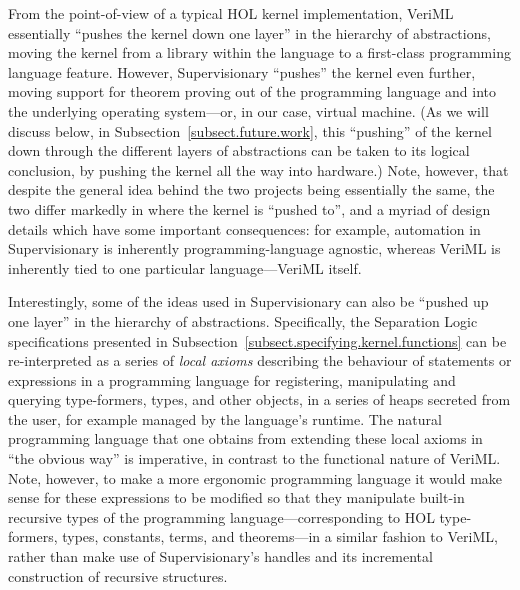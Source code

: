\documentclass[a4paper, UKenglish, cleveref, autoref, thm-restate, colorlinks]{lipics-v2021}
\begin{document}
From the point-of-view of a typical HOL kernel implementation, VeriML essentially ``pushes the kernel down one layer'' in the hierarchy of abstractions, moving the kernel from a library within the language to a first-class programming language feature.
However, Supervisionary ``pushes'' the kernel even further, moving support for theorem proving out of the programming language and into the underlying operating system---or, in our case, virtual machine.
(As we will discuss below, in Subsection~\ref{subsect.future.work}, this ``pushing'' of the kernel down through the different layers of abstractions can be taken to its logical conclusion, by pushing the kernel all the way into hardware.)
Note, however, that despite the general idea behind the two projects being essentially the same, the two differ markedly in where the kernel is ``pushed to'', and a myriad of design details which have some important consequences: for example, automation in Supervisionary is inherently programming-language agnostic, whereas VeriML is inherently tied to one particular language---VeriML itself.

Interestingly, some of the ideas used in Supervisionary can also be ``pushed up one layer'' in the hierarchy of abstractions.
Specifically, the Separation Logic specifications presented in Subsection~\ref{subsect.specifying.kernel.functions} can be re-interpreted as a series of \emph{local axioms} describing the behaviour of statements or expressions in a programming language for registering, manipulating and querying type-formers, types, and other objects, in a series of heaps secreted from the user, for example managed by the language's runtime.
The natural programming language that one obtains from extending these local axioms in ``the obvious way'' is imperative, in contrast to the functional nature of VeriML.
Note, however, to make a more ergonomic programming language it would make sense for these expressions to be modified so that they manipulate built-in recursive types of the programming language---corresponding to HOL type-formers, types, constants, terms, and theorems---in a similar fashion to VeriML, rather than make use of Supervisionary's handles and its incremental construction of recursive structures.
\end{document}
